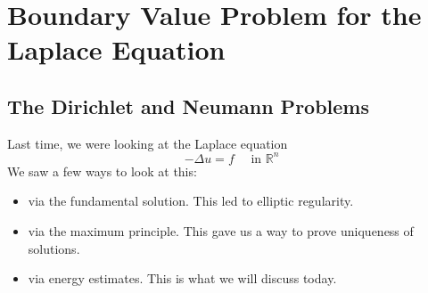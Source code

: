\newpage
\section{Boundary Value Problem for the Laplace Equation}

\subsection{The Dirichlet and Neumann Problems}

Last time, we were looking at the Laplace equation
$$
-\Delta u=f \quad \text { in } \mathbb{R}^{n}
$$
We saw a few ways to look at this:
\begin{itemize}
    \item via the fundamental solution. This led to elliptic regularity.
    \item via the maximum principle. This gave us a way to prove uniqueness of solutions.
    \item via energy estimates. This is what we will discuss today.
\end{itemize}

